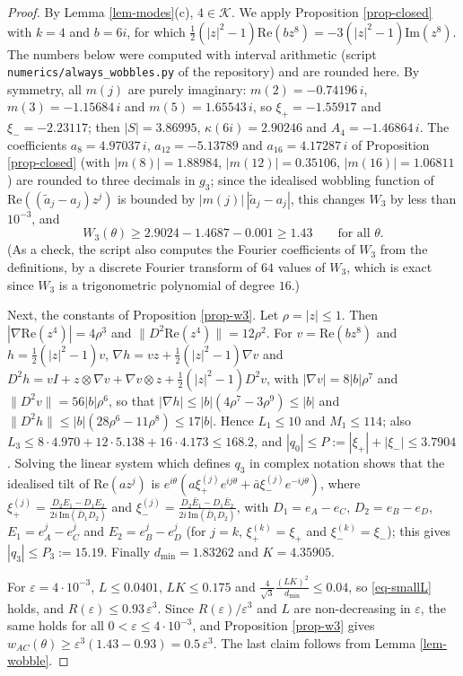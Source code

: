 \documentclass[a4paper,11pt,twoside,leqno]{article}
\newcommand{\eps}[0]{\varepsilon}
\numberwithin{equation}{section}
\begin{document}
\begin{proof}
By Lemma \ref{lem-modes}(c), $4 \in \mathcal{K}$. We apply Proposition \ref{prop-closed} with $k = 4$ and $b = 6i$, for which $\frac{1}{2}(|z|^2 - 1)\mathrm{Re}(b z^8) = -3(|z|^2-1)\mathrm{Im}(z^8)$. The numbers below were computed with interval arithmetic (script \texttt{numerics/always\_wobbles.py} of the repository) and are rounded here. By symmetry, all $m(j)$ are purely imaginary: $m(2) = -0.74196\, i$, $m(3) = -1.15684\, i$ and $m(5) = 1.65543\, i$, so $\xi_+ = -1.55917$ and $\xi_- = -2.23117$; then $|S| = 3.86995$, $\kappa(6i) = 2.90246$ and $A_4 = -1.46864\, i$. The coefficients $a_8 = 4.97037\, i$, $a_{12} = -5.13789$ and $a_{16} = 4.17287\, i$ of Proposition \ref{prop-closed} (with $|m(8)| = 1.88984$, $|m(12)| = 0.35106$, $|m(16)| = 1.06811$) are rounded to three decimals in $g_3$; since the idealised wobbling function of $\mathrm{Re}((\tilde a_j - a_j) z^j)$ is bounded by $|m(j)|\,|\tilde a_j - a_j|$, this changes $W_3$ by less than $10^{-3}$, and
\[
W_3(\theta) \geq 2.9024 - 1.4687 - 0.001 \geq 1.43 \qquad \text{for all } \theta.
\]
(As a check, the script also computes the Fourier coefficients of $W_3$ from the definitions, by a discrete Fourier transform of $64$ values of $W_3$, which is exact since $W_3$ is a trigonometric polynomial of degree $16$.)

Next, the constants of Proposition \ref{prop-w3}. Let $\rho = |z| \leq 1$. Then $|\nabla \mathrm{Re}(z^4)| = 4\rho^3$ and $\|D^2 \mathrm{Re}(z^4)\| = 12\rho^2$. For $v = \mathrm{Re}(b z^8)$ and $h = \frac{1}{2}(|z|^2 - 1) v$, $\nabla h = v z + \frac{1}{2}(|z|^2 - 1)\nabla v$ and $D^2 h = v I + z \otimes \nabla v + \nabla v \otimes z + \frac{1}{2}(|z|^2 - 1) D^2 v$, with $|\nabla v| = 8|b|\rho^7$ and $\|D^2 v\| = 56|b|\rho^6$, so that $|\nabla h| \leq |b|(4\rho^7 - 3\rho^9) \leq |b|$ and $\|D^2 h\| \leq |b|(28\rho^6 - 11\rho^8) \leq 17|b|$. Hence $L_1 \leq 10$ and $M_1 \leq 114$; also $L_3 \leq 8 \cdot 4.970 + 12 \cdot 5.138 + 16 \cdot 4.173 \leq 168.2$, and $|q_0| \leq P := |\xi_+| + |\xi_-| \leq 3.7904$. Solving the linear system which defines $q_3$ in complex notation shows that the idealised tilt of $\mathrm{Re}(a z^j)$ is $e^{i\theta}(a \xi^{(j)}_+ e^{ij\theta} + \bar a \xi^{(j)}_- e^{-ij\theta})$, where $\xi^{(j)}_+ = \frac{D_2 E_1 - D_1 E_2}{2i\, \mathrm{Im}(\bar D_1 D_2)}$ and $\xi^{(j)}_- = \frac{D_2 \bar E_1 - D_1 \bar E_2}{2i\, \mathrm{Im}(\bar D_1 D_2)}$, with $D_1 = e_A - e_C$, $D_2 = e_B - e_D$, $E_1 = e_A^j - e_C^j$ and $E_2 = e_B^j - e_D^j$ (for $j = k$, $\xi^{(k)}_+ = \xi_+$ and $\xi^{(k)}_- = \xi_-$); this gives $|q_3| \leq P_3 := 15.19$. Finally $d_{\min} = 1.83262$ and $K = 4.35905$.

For $\eps = 4\cdot 10^{-3}$, $L \leq 0.0401$, $LK \leq 0.175$ and $\frac{4}{\sqrt{3}}\frac{(LK)^2}{d_{\min}} \leq 0.04$, so \eqref{eq-smallL} holds, and $R(\eps) \leq 0.93\, \eps^3$. Since $R(\eps)/\eps^3$ and $L$ are non-decreasing in $\eps$, the same holds for all $0 < \eps \leq 4\cdot 10^{-3}$, and Proposition \ref{prop-w3} gives $w_{AC}(\theta) \geq \eps^3 (1.43 - 0.93) = 0.5\,\eps^3$. The last claim follows from Lemma \ref{lem-wobble}.
\end{proof}
\end{document}
